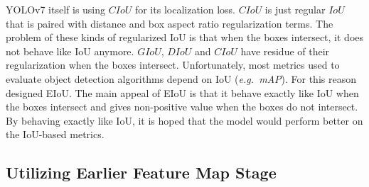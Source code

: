   YOLOv7 itself is using $CIoU$ for its localization loss. $CIoU$ is just regular $IoU$
  that is paired with distance and box aspect ratio regularization terms.
  The problem of these kinds of regularized IoU is that when the boxes intersect, it does not
  behave like IoU anymore. $GIoU$, $DIoU$ and $CIoU$ have residue of their regularization when
  the boxes intersect. Unfortunately, most metrics used to evaluate object detection
  algorithms depend on IoU (\textit{e.g.\ mAP}).
  For this reason \textcite{eiou} designed EIoU. The main appeal of EIoU
  is that it behave exactly like IoU when the boxes intersect and gives non-positive value when the
  boxes do not intersect.
  By behaving exactly like IoU, it is hoped that the model would perform better on the IoU-based metrics.




  \subsection{Utilizing Earlier Feature Map Stage}

